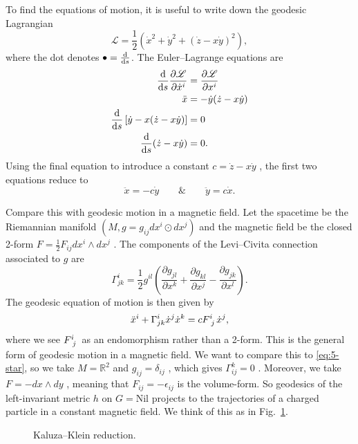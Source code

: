 To find the equations of motion, it is useful to write down the geodesic Lagrangian 
\begin{equation}
  \mathscr{L} = \frac{1}{2}( \dot{x}^2 + \dot{y}^2 + (\dot{z} - x \dot{y})^2),
\end{equation}
where the dot denotes $\bullet = \dv{s}$.
The Euler--Lagrange equations are
\begin{align}
  \dv{s} \frac{\partial \mathscr{L}}{\partial \dot{x}^{i}} &= \frac{\partial \mathscr{L}}{\partial x^{i}} \\
  \ddot x &= - \dot{y} (\dot{z} - x \dot{y}) \\
  \dv{s} \left[ \dot{y} - x (\dot{z} - x \dot{y}) \right] &= 0 \\
  \dv{s}(\dot{z} - x \dot{y}) &= 0.
\end{align}
Using the final equation to introduce a constant $c = \dot{z} - x \dot{y}$ , the first two equations reduce to
\begin{equation}
  \label{eq:5-star}
  \ddot x =  - c \dot y \qquad \& \qquad
  \ddot y = c \dot x.
\end{equation}

Compare this with geodesic motion in a magnetic field.
Let the spacetime be the Riemannian manifold $(M, g = g_{ij} dx^{i} \odot dx^{j})$  and the magnetic field be the closed 2-form $F = \frac{1}{2} F_{ij} dx^{i} \wedge dx^{j}$ .
The components of the Levi--Civita connection associated to $g$ are
\begin{equation}
  \Gamma^{i}_{jk} = \frac{1}{2} g^{il} \left( \frac{\partial g_{jl}}{\partial x^{k}} + \frac{\partial g_{kl}}{\partial x^{j}} - \frac{\partial g_{jk}}{\partial x^{l}} \right).
\end{equation}
The geodesic equation of motion is then given by
\begin{equation}
  \ddot x^{i} + \Gamma^{i}_{jk} \dot{x}^{j} \dot{x}^{k} = c F\indices{^{i}_{j}} \dot{x}^{j},
\end{equation}
where we see $F\indices{^{i}_{j}}$  as an endomorphism rather than a 2-form.
This is the general form of geodesic motion in a magnetic field.
We want to compare this to \eqref{eq:5-star}, so we take $M = \mathbb{R}^2$ and $g_{ij} = \delta_{ij}$ , which gives $\Gamma_{ij}^{k} = 0$ .
Moreover, we take $F = -dx \wedge dy$ , meaning that $F_{ij} = - \epsilon_{ij}$  is the volume-form.
So geodesics of the left-invariant metric $h$ on $G = \text{Nil}$  projects to the trajectories of a charged particle in a constant magnetic field.
We think of this as in Fig.~\ref{fig:l5f1}.
\begin{figure}[tbhp]
  \centering
  \def\svgwidth{0.6\columnwidth}
  
  \caption{Kaluza--Klein reduction.}
  \label{fig:l5f1}
\end{figure}

